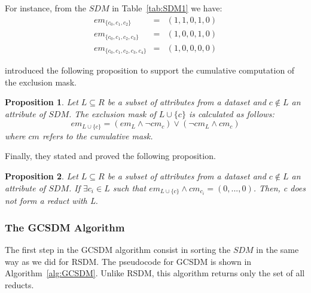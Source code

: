 \documentclass[authoryear,11pt]{elsarticle}
\newtheorem{proposition}{Proposition}
\begin{document}
	For instance, from the $SDM$ in Table~\ref{tab:SDM1} we have:
	$$\begin{array}{lcc}
	  em_{\lbrace c_0,c_1,c_2\rbrace}         &=& (1,1,0,1,0)\\
	  em_{\lbrace c_0,c_1,c_2,c_3\rbrace}     &=& (1,0,0,1,0)\\
	  em_{\lbrace c_0,c_1,c_2,c_3,c_4\rbrace} &=& (1,0,0,0,0)
	\end{array}$$
	
	\cite{Lias13} introduced the following proposition to support the cumulative computation of the exclusion mask.
	
	\begin{proposition}\label{prop:cumul} 
		Let $L \subseteq R$ be a subset of attributes from a dataset and $c \notin L$ an attribute of $SDM$.
		The exclusion mask of $L \cup \lbrace c\rbrace$ is calculated as follows:
		$$em_{L \cup \lbrace c\rbrace}=(em_L \wedge \neg cm_c) \vee (\neg cm_L \wedge cm_c)$$
		where $cm$ refers to the cumulative mask.
	\end{proposition}
	
	Finally, they stated and proved the following proposition.
	
	\begin{proposition}\label{prop:exclude} 
		Let $L \subseteq R$ be a subset of attributes from a dataset and $c \notin L$ an attribute of $SDM$.
		If $\exists c_i \in L$ such that $em_{L \cup \lbrace c\rbrace} \wedge cm_{c_i}=(0,...,0)$. Then, c
		does not form a reduct with L.
	\end{proposition}
	
	
\subsubsection{The GCSDM Algorithm}	

	The first step in the GCSDM algorithm consist in sorting the $SDM$ in the same way as we did for RSDM. 
	The pseudocode for GCSDM is shown in Algorithm~\ref{alg:GCSDM}. Unlike RSDM, this algorithm returns
	only the set of all reducts.
	
\end{document}
